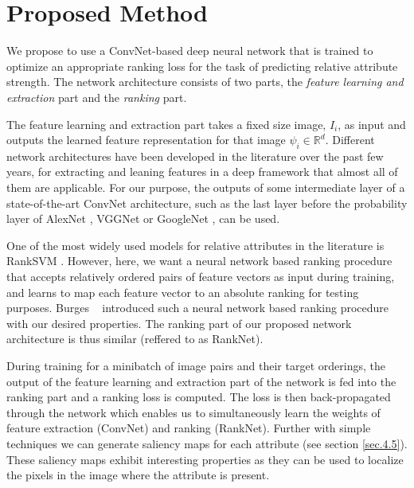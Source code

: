 

\section{Proposed Method}
\label{sec.3}

We propose to use a ConvNet-based deep neural network that is trained to optimize an appropriate ranking loss for the task of predicting relative attribute strength. The network architecture consists of two parts, the \textit{feature learning and extraction} part and the \textit{ranking} part.

The feature learning and extraction part takes a fixed size image, $I_i$, as input and outputs the learned feature representation for that image $\psi_i \in \mathbb{R}^d$.
Different network architectures have been developed in the literature over the past few years, for extracting and leaning features in a deep framework that almost all of them are applicable. For our purpose, the outputs of some intermediate layer of a state-of-the-art ConvNet architecture, such as the last layer before the probability layer of AlexNet \cite{krizshevsky}, VGGNet \cite{verydeep} or GoogleNet \cite{googlenet},
can be used.

One of the most widely used models for relative attributes in the literature is RankSVM \cite{Joachims2002}. However, here, we want a neural network based ranking procedure that accepts relatively ordered pairs of feature vectors as input during training, and learns to map each feature vector to an absolute ranking for testing purposes. Burges \etal~\cite{Burges2005} introduced such a neural network based ranking procedure with our desired properties. The ranking part of our proposed network architecture is thus similar (reffered to as RankNet).

During training for a minibatch of image pairs and their target orderings, the output of the feature learning and extraction part of the network is fed into the ranking part and a ranking loss is computed. The loss is then back-propagated through the network which enables us to simultaneously learn the weights of feature extraction (ConvNet) and ranking (RankNet). Further with simple techniques we can generate saliency maps for each attribute (see section \ref{sec.4.5}). These saliency maps exhibit interesting properties as they can be used to localize the pixels in the image where the attribute is present.


